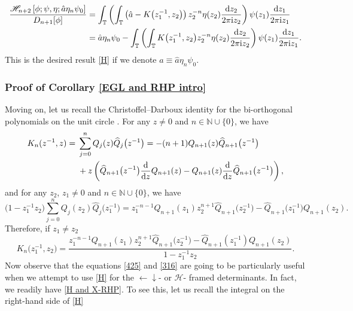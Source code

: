 \documentclass[10pt,a4paper]{amsart}
\numberwithin{equation}{section}
\newcommand{\N}{{\mathbb N}}
\newcommand{\T}{{\mathbb T}}
\newcommand{\ii}{{\rm i}}
\newcommand{\dd}{{\rm d}}
\begin{document}
		\begin{equation*}
			\begin{split}
				\frac{\mathscr{H}_{n+2}\left[\phi; \psi, \eta ;\hat{a} \eta_n \psi_{0}\right]}{D_{n+1}[\phi]} & = \int_{\T} \left(\int_{\T} \left(\hat{a}-K\big(z^{-1}_1,z_2\big) \right) z^{-n}_2 \eta(z_2) \frac{\dd z_2}{2 \pi \ii z_2} \right) \psi(z_1) \frac{\dd z_1}{2 \pi \ii z_1} \\
 & = \hat{a} \eta_n \psi_{0} - \int_{\T} \left(\int_{\T} K\big(z^{-1}_1,z_2\big) z^{-n}_2 \eta(z_2) \frac{\dd z_2}{2 \pi \ii z_2} \right) \psi(z_1) \frac{\dd z_1}{2 \pi \ii z_1}.
			\end{split}
		\end{equation*}
		This is the desired result \eqref{H} if we denote $a \equiv \hat{a} \eta_n \psi_{0}$.
		\subsubsection{Proof of Corollary \ref{EGL and RHP intro}}			
		Moving on, let us recall the Christoffel--Darboux identity for the bi-orthogonal polynomials on the unit circle \cite{DIK,SzegoOP}. For any $z \neq 0$ and $n \in \N \cup \{0\}$, we have
		\begin{align}
				K_{n}(z^{-1},z) ={}& \sum_{j=0}^{n} Q_{j}(z)\widehat{Q}_{j}\big(z^{-1}\big) = -(n+1) Q_{n+1}(z)\widehat{Q}_{n+1}\big(z^{-1}\big) \nonumber\\
 & + z \left( \widehat{Q}_{n+1}\big(z^{-1}\big) \frac{\dd}{\dd z} Q_{n+1}(z) - Q_{n+1}(z) \frac{\dd}{\dd z} \widehat{Q}_{n+1}\big(z^{-1}\big) \right),\label{425}
		\end{align}		
and for any $z_2$, $z_1 \neq 0$ and $n \in \N \cup \{0\}$, we have
		\begin{equation*}
			\big(1-z^{-1}_1z_2\big) \sum_{j=0}^{n} Q_{j}(z_2)\widehat{Q}_{j}\big(z^{-1}_1\big) = z_1^{-n-1}Q_{n+1}(z_1)z_2^{n+1}\widehat{Q}_{n+1}\big(z_2^{-1}\big) - \widehat{Q}_{n+1}\big(z^{-1}_1\big) Q_{n+1}(z_2).
		\end{equation*}
		Therefore, if $z_1 \neq z_2$
		\begin{equation}\label{316}
			K_{n}\big(z^{-1}_1,z_2\big) = \frac{z_1^{-n-1}Q_{n+1}(z_1)z_2^{n+1}\widehat{Q}_{n+1}\big(z_2^{-1}\big) - \widehat{Q}_{n+1}(z_1^{-1}) Q_{n+1}(z_2)}{1-z^{-1}_1z_2}.
		\end{equation}
		Now observe that the equations \eqref{425} and \eqref{316} are going to be particularly useful when we attempt to use \eqref{H} for the $\leftarrow \downarrow $- or $\mathscr{H}$- framed determinants. In fact, we readily have \eqref{H and X-RHP}. To see this, let us recall the integral on the right-hand side of \eqref{H}
\end{document}
